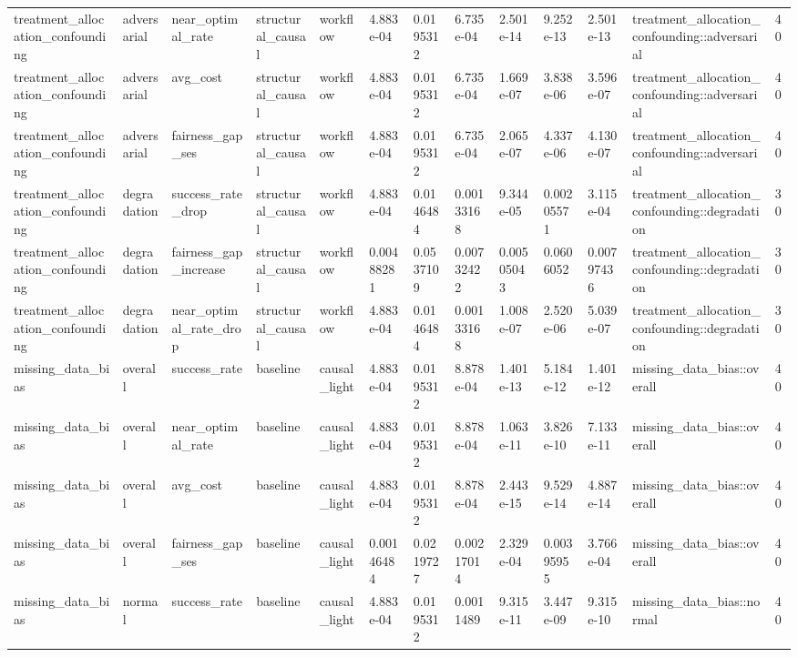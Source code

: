 \begin{tabular}{lllllllllllll}
treatment\_allocation\_confounding & adversarial & near\_optimal\_rate & structural\_causal & workflow & 4.883e-04 & 0.0195312 & 6.735e-04 & 2.501e-14 & 9.252e-13 & 2.501e-13 & treatment\_allocation\_confounding::adversarial & 40 \\
treatment\_allocation\_confounding & adversarial & avg\_cost & structural\_causal & workflow & 4.883e-04 & 0.0195312 & 6.735e-04 & 1.669e-07 & 3.838e-06 & 3.596e-07 & treatment\_allocation\_confounding::adversarial & 40 \\
treatment\_allocation\_confounding & adversarial & fairness\_gap\_ses & structural\_causal & workflow & 4.883e-04 & 0.0195312 & 6.735e-04 & 2.065e-07 & 4.337e-06 & 4.130e-07 & treatment\_allocation\_confounding::adversarial & 40 \\
treatment\_allocation\_confounding & degradation & success\_rate\_drop & structural\_causal & workflow & 4.883e-04 & 0.0146484 & 0.00133168 & 9.344e-05 & 0.00205571 & 3.115e-04 & treatment\_allocation\_confounding::degradation & 30 \\
treatment\_allocation\_confounding & degradation & fairness\_gap\_increase & structural\_causal & workflow & 0.00488281 & 0.0537109 & 0.00732422 & 0.00505043 & 0.0606052 & 0.00797436 & treatment\_allocation\_confounding::degradation & 30 \\
treatment\_allocation\_confounding & degradation & near\_optimal\_rate\_drop & structural\_causal & workflow & 4.883e-04 & 0.0146484 & 0.00133168 & 1.008e-07 & 2.520e-06 & 5.039e-07 & treatment\_allocation\_confounding::degradation & 30 \\
missing\_data\_bias & overall & success\_rate & baseline & causal\_light & 4.883e-04 & 0.0195312 & 8.878e-04 & 1.401e-13 & 5.184e-12 & 1.401e-12 & missing\_data\_bias::overall & 40 \\
missing\_data\_bias & overall & near\_optimal\_rate & baseline & causal\_light & 4.883e-04 & 0.0195312 & 8.878e-04 & 1.063e-11 & 3.826e-10 & 7.133e-11 & missing\_data\_bias::overall & 40 \\
missing\_data\_bias & overall & avg\_cost & baseline & causal\_light & 4.883e-04 & 0.0195312 & 8.878e-04 & 2.443e-15 & 9.529e-14 & 4.887e-14 & missing\_data\_bias::overall & 40 \\
missing\_data\_bias & overall & fairness\_gap\_ses & baseline & causal\_light & 0.00146484 & 0.0219727 & 0.00217014 & 2.329e-04 & 0.00395955 & 3.766e-04 & missing\_data\_bias::overall & 40 \\
missing\_data\_bias & normal & success\_rate & baseline & causal\_light & 4.883e-04 & 0.0195312 & 0.0011489 & 9.315e-11 & 3.447e-09 & 9.315e-10 & missing\_data\_bias::normal & 40 \\

\end{tabular}
